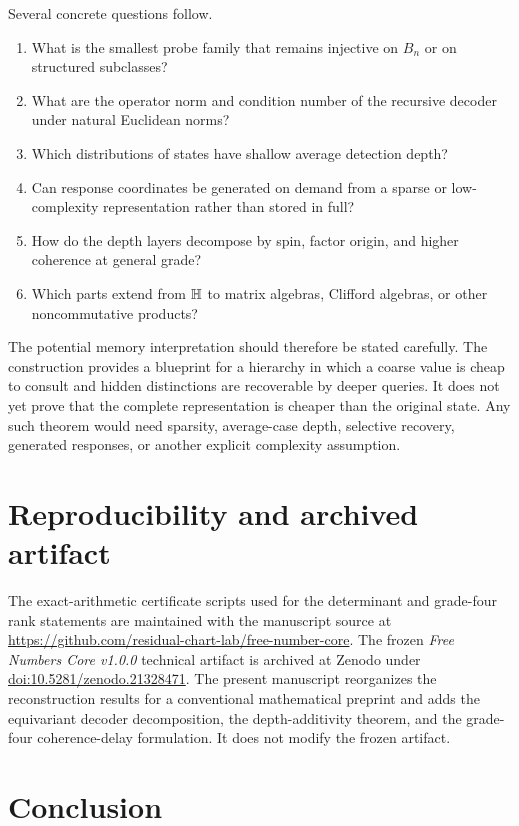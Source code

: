 Several concrete questions follow.
\begin{enumerate}
  \item What is the smallest probe family that remains injective on $B_n$ or on structured subclasses?
  \item What are the operator norm and condition number of the recursive decoder under natural Euclidean norms?
  \item Which distributions of states have shallow average detection depth?
  \item Can response coordinates be generated on demand from a sparse or low-complexity representation rather than stored in full?
  \item How do the depth layers decompose by spin, factor origin, and higher coherence at general grade?
  \item Which parts extend from $\mathbb H$ to matrix algebras, Clifford algebras, or other noncommutative products?
\end{enumerate}

The potential memory interpretation should therefore be stated carefully.  The construction provides a blueprint for a hierarchy in which a coarse value is cheap to consult and hidden distinctions are recoverable by deeper queries.  It does not yet prove that the complete representation is cheaper than the original state.  Any such theorem would need sparsity, average-case depth, selective recovery, generated responses, or another explicit complexity assumption.

\section*{Reproducibility and archived artifact}

The exact-arithmetic certificate scripts used for the determinant and grade-four rank statements are maintained with the manuscript source at
\url{https://github.com/residual-chart-lab/free-number-core}.
The frozen \emph{Free Numbers Core v1.0.0} technical artifact is archived at Zenodo under
\href{https://doi.org/10.5281/zenodo.21328471}{doi:10.5281/zenodo.21328471}.
The present manuscript reorganizes the reconstruction results for a conventional mathematical preprint and adds the equivariant decoder decomposition, the depth-additivity theorem, and the grade-four coherence-delay formulation.  It does not modify the frozen artifact.

\section{Conclusion}

